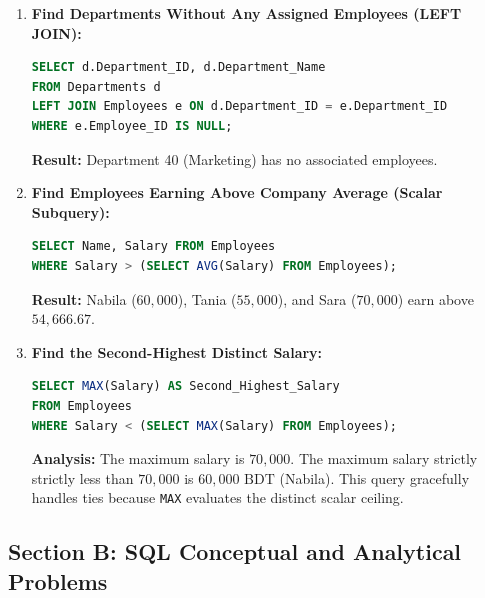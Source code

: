 \begin{enumerate}[label=\textbf{Problem \arabic*.},leftmargin=1.5cm]
\item \textbf{Find Departments Without Any Assigned Employees (LEFT JOIN):}
\begin{lstlisting}[language=SQL]
SELECT d.Department_ID, d.Department_Name
FROM Departments d
LEFT JOIN Employees e ON d.Department_ID = e.Department_ID
WHERE e.Employee_ID IS NULL;
\end{lstlisting}
\textbf{Result:} Department 40 (Marketing) has no associated employees.

\item \textbf{Find Employees Earning Above Company Average (Scalar Subquery):}
\begin{lstlisting}[language=SQL]
SELECT Name, Salary FROM Employees
WHERE Salary > (SELECT AVG(Salary) FROM Employees);
\end{lstlisting}
\textbf{Result:} Nabila ($60,000$), Tania ($55,000$), and Sara ($70,000$) earn above $54,666.67$.

\item \textbf{Find the Second-Highest Distinct Salary:}
\begin{lstlisting}[language=SQL]
SELECT MAX(Salary) AS Second_Highest_Salary
FROM Employees
WHERE Salary < (SELECT MAX(Salary) FROM Employees);
\end{lstlisting}
\textbf{Analysis:} The maximum salary is $70,000$. The maximum salary strictly strictly less than $70,000$ is $\boxed{60,000\text{ BDT}}$ (Nabila). This query gracefully handles ties because \texttt{MAX} evaluates the distinct scalar ceiling.
\end{enumerate}

\subsection{Section B: SQL Conceptual and Analytical Problems}

